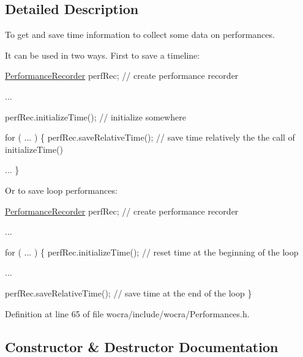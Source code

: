 \subsection{Detailed Description}
To get and save time information to collect some data on performances. 

It can be used in two ways. First to save a timeline\+:


\begin{DoxyCode}
\hyperlink{classwocra_1_1PerformanceRecorder_afcefa140d40279c65b10a38ff5c6549b}{PerformanceRecorder}     perfRec;    \textcolor{comment}{// create performance recorder}

...

perfRec.initializeTime();             \textcolor{comment}{// initialize somewhere}

\textcolor{keywordflow}{for} ( ... )
\{
    perfRec.saveRelativeTime();       \textcolor{comment}{// save time relatively the the call of initializeTime()}

    ...
\}
\end{DoxyCode}


Or to save loop performances\+:


\begin{DoxyCode}
\hyperlink{classwocra_1_1PerformanceRecorder_afcefa140d40279c65b10a38ff5c6549b}{PerformanceRecorder}     perfRec;    \textcolor{comment}{// create performance recorder}

...

for ( ... )
\{
    perfRec.initializeTime();       \textcolor{comment}{// reset time at the beginning of the loop}

    ...

    perfRec.saveRelativeTime();     \textcolor{comment}{// save time at the end of the loop}
\}
\end{DoxyCode}
 

Definition at line 65 of file wocra/include/wocra/\+Performances.\+h.



\subsection{Constructor \& Destructor Documentation}
\hypertarget{classwocra_1_1PerformanceRecorder_afcefa140d40279c65b10a38ff5c6549b}{}\label{classwocra_1_1PerformanceRecorder_afcefa140d40279c65b10a38ff5c6549b} 

